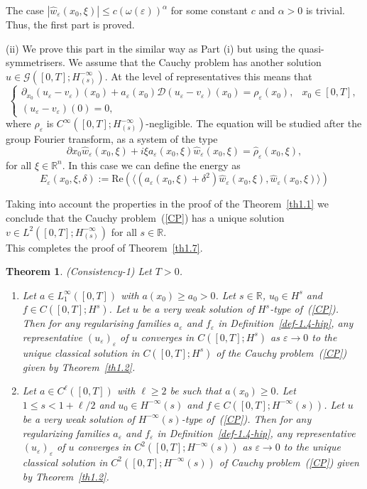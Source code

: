 \documentclass[12pt]{amsart}
\newtheorem{theorem}{Theorem}[section]
\theoremstyle{definition}
\begin{document}
The case $|\hat{w}_\varepsilon(x_0, \xi)| \leq c (\omega(\varepsilon))^\alpha$ for some constant $c$ and $\alpha > 0$ is trivial. Thus, the first part is proved.


\vspace{0.5cm}
(ii) We prove this part in the similar way as Part (i) but using the quasi-symmetrisers. We assume that the Cauchy problem has another solution $u \in \mathcal{G}([0, T]; H^{-\infty}_{(s)})$. At the level of representatives this means that
\[
\begin{cases}
\partial_{x_0} (u_\varepsilon - v_\varepsilon)(x_0) + a_\varepsilon(x_0)\mathcal{D}(u_\varepsilon - v_\varepsilon)(x_0) = \rho_\varepsilon(x_0), & x_0 \in [0, T], \\
(u_\varepsilon - v_\varepsilon)(0) = 0,
\end{cases}
\]
where $\rho_\varepsilon$ is $C^\infty([0, T]; H^{-\infty}_{(s)})$-negligible. 
The equation will be studied after the group Fourier transform, as a system of the type
\[
\partial{x_0} \hat{w}_\varepsilon(x_0, \xi) + i \xi a_\varepsilon(x_0, \xi) \hat{w}_\varepsilon(x_0, \xi)= \hat{\rho}_\varepsilon(x_0, \xi),
\]
for all $\xi \in \mathbb{R}^n$.
In this case we can define the energy as
\[
E_\varepsilon(x_0, \xi, \delta) := \mathrm{Re}(\langle (a_\varepsilon(x_0, \xi) + \delta^2) \hat{w}_\varepsilon(x_0, \xi), \hat{w}_\varepsilon(x_0, \xi)\rangle)
\]

Taking into account the properties in the proof of the Theorem~\ref{th1.1} we conclude that the Cauchy problem~(\ref{CP}) has a unique solution $v \in L^2([0, T]; H^{-\infty}_{(s)})$ for all $s \in \mathbb{R}$.\\
This completes the proof of Theorem~\ref{th1.7}. 

\begin{theorem}(Consistency-1)
\label{th1.8}
Let $T > 0$.
\begin{enumerate}
    \item[(i)] Let $a \in L^\infty_1([0, T])$ with $a(x_0) \geq a_0 > 0$. Let $s \in \mathbb{R}$, $u_0 \in H^{s}$ and $f \in C([0, T]; H^s)$. Let $u$ be a very weak solution of $H^s$-type of~(\ref{CP}). Then for any regularising families $a_\varepsilon$ and $f_\varepsilon$ in Definition~\ref{def-1.4-hip}, any representative $(u_\varepsilon)_\varepsilon$ of $u$ converges in $C([0, T]; H^{s})$ as $\varepsilon \to 0$ to the unique classical solution in $C([0, T]; H^{s})$ of the Cauchy problem~(\ref{CP}) given by Theorem~\ref{th1.2}.
    
    \item[(ii)] Let $a \in C^\ell([0, T])$ with $\ell \geq 2$ be such that $a(x_0) \geq 0$. Let $1 \leq s < 1 + \ell/2$ and $u_0\in H^{-\infty}(s)$ and $f \in C([0, T]; H^{-\infty}(s))$. Let $u$ be a very weak solution of $H^{-\infty}(s)$-type of~(\ref{CP}). Then for any regularizing families $a_\varepsilon$ and $f_\varepsilon$ in Definition~\ref{def-1.4-hip}, any representative $(u_\varepsilon)_\varepsilon$ of $u$ converges in $C^2([0, T]; H^{-\infty}(s))$ as $\varepsilon \to 0$ to the unique classical solution in $C^2([0, T]; H^{-\infty}(s))$ of Cauchy problem~(\ref{CP}) given by Theorem~\ref{th1.2}.
\end{enumerate}
\end{theorem}
\end{document}
